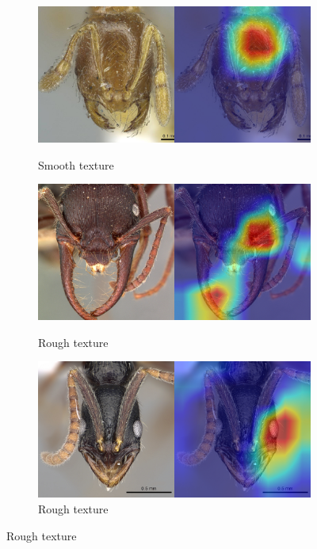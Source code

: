 \documentclass{aci}
\numberwithin{equation}{section}
\begin{document}
\begin{figure}
\begin{subfigure}{\subwidth}
        \label{fig:incorrect_ideal_177}
    \end{subfigure}
    \begin{subfigure}{\subwidth}
        \caption*{Smooth texture}
        \includegraphics[width=1\linewidth]{thesis_assets/gradcam/incorrect_ideal/197.png}
        \label{fig:incorrect_ideal_197}
    \end{subfigure}
    \begin{subfigure}{\subwidth}
        \caption*{Rough texture}
        \includegraphics[width=1\linewidth]{thesis_assets/gradcam/incorrect_nonideal/1.png}
        \label{fig:incorrect_nonideal_1}
    \end{subfigure}
    \begin{subfigure}{\subwidth}
        \caption*{Rough texture}
        \includegraphics[width=1\linewidth]{thesis_assets/gradcam/incorrect_nonideal/22.png}

\end{subfigure}
\end{figure}
\end{document}
